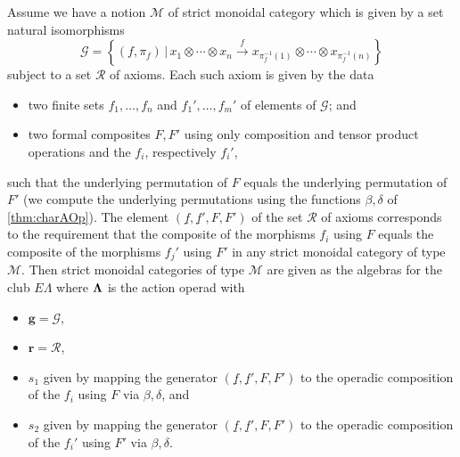\begin{cor}\label{pres2}
Assume we have a notion $\mathcal{M}$ of strict monoidal category which is given by  a set natural isomorphisms
  \[
    \mathcal{G} = \left\{ (f, \pi_{f}) \, | \,  x_{1} \otimes \cdots \otimes x_{n} \stackrel{f}{\longrightarrow} x_{\pi_{f}^{-1}(1)} \otimes \cdots \otimes x_{\pi_{f}^{-1}(n)} \right\}
  \]
subject to a set $\mathcal{R}$ of axioms. Each such axiom is given by the data
\begin{itemize}
  \item two finite sets $f_{1}, \ldots, f_{n}$ and $f_{1}', \ldots, f_{m}'$ of elements of $\mathcal{G}$; and
  \item two formal composites $F,F'$ using only composition and tensor product operations and the $f_{i}$, respectively $f_{i}'$, 
\end{itemize}
such that the underlying permutation of $F$ equals the underlying permutation of $F'$ (we compute the underlying permutations using the functions $\beta, \delta$ of \cref{thm:charAOp}). The element $\left(\underline{f}, \underline{f}', F, F'\right)$ of the set $\mathcal{R}$ of axioms corresponds to the requirement that the composite of the morphisms $f_{i}$ using $F$ equals the composite of the morphisms $f_{j}'$ using $F'$ in any strict monoidal category of type $\mathcal{M}$. Then strict monoidal categories of type $\mathcal{M}$ are given as the algebras for the club $E\Lambda$ where $\mathbf{\Lambda}$ is the action operad with
\begin{itemize}
  \item $\mathbf{g} = \mathcal{G}$,
  \item $\mathbf{r} = \mathcal{R}$,
  \item $s_{1}$ given by mapping the generator $\left(\underline{f}, \underline{f}', F, F'\right)$ to the operadic composition of the $f_{i}$ using $F$ via $\beta, \delta$, and
  \item $s_{2}$ given by mapping the generator $\left(\underline{f}, \underline{f}', F, F'\right)$ to the operadic composition of the $f_{i}'$ using $F'$ via $\beta, \delta$.
\end{itemize}
\end{cor}
